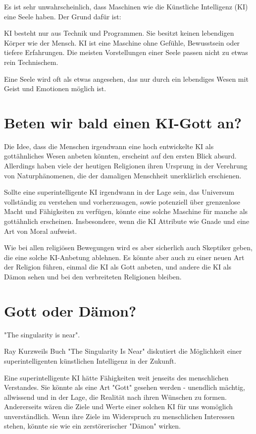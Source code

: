 \documentclass[10pt]{article}
\begin{document}
Es ist sehr unwahrscheinlich, dass Maschinen wie die Künstliche Intelligenz (KI) eine Seele haben. Der Grund dafür ist:

KI besteht nur aus Technik und Programmen. Sie besitzt keinen lebendigen Körper wie der Mensch. KI ist eine Maschine ohne Gefühle, Bewusstsein oder tiefere Erfahrungen. Die meisten Vorstellungen einer Seele passen nicht zu etwas rein Technischem.

Eine Seele wird oft als etwas angesehen, das nur durch ein lebendiges Wesen mit Geist und Emotionen möglich ist.
\cite{MDR}


\newpage
\section{Beten wir bald einen KI-Gott an?}

Die Idee, dass die Menschen irgendwann eine hoch entwickelte KI als gottähnliches Wesen anbeten könnten, erscheint auf den ersten Blick absurd.
Allerdings haben viele der heutigen Religionen ihren Ursprung in der Verehrung von Naturphänomenen, die der damaligen Menschheit unerklärlich erschienen.


Sollte eine superintelligente KI irgendwann in der Lage sein, das Universum vollständig zu verstehen und vorherzusagen, sowie potenziell über grenzenlose Macht und Fähigkeiten zu verfügen, könnte eine solche Maschine für manche als gottähnlich erscheinen. Insbesondere, wenn die KI Attribute wie Gnade und eine Art von Moral aufweist.

Wie bei allen religiösen Bewegungen wird es aber sicherlich auch Skeptiker geben, die eine solche KI-Anbetung ablehnen.
Es könnte aber auch zu einer neuen Art der Religion führen, einmal die KI als Gott anbeten, und andere die KI als Dämon sehen und bei den verbreiteten Religionen bleiben.
\cite{BR}
\section{Gott oder Dämon?}
"The singularity is near".

Ray Kurzweils Buch "The Singularity Is Near" diskutiert die Möglichkeit einer superintelligenten künstlichen Intelligenz in der Zukunft.

Eine superintelligente KI hätte Fähigkeiten weit jenseits des menschlichen Verstandes.
Sie könnte als eine Art "Gott" gesehen werden - unendlich mächtig, allwissend und in der Lage, die Realität nach ihren Wünschen zu formen.
Andererseits wären die Ziele und Werte einer solchen KI für uns womöglich unverständlich.
Wenn ihre Ziele im Widerspruch zu menschlichen Interessen stehen, könnte sie wie ein zerstörerischer "Dämon" wirken.
\end{document}
